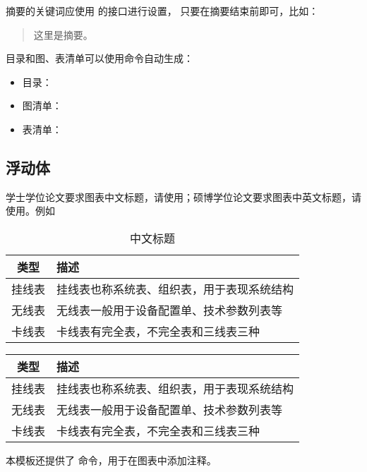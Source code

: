\documentclass[a4paper]{ltxdoc}
\begin{document}
摘要的关键词应使用  的接口进行设置，
只要在摘要结束前即可，比如：
\begin{latex}
  \begin{abstract}
    这里是摘要。
  \end{abstract}
\end{latex}

目录和图、表清单可以使用命令自动生成：
\begin{itemize}
  \item 目录：  
  \item 图清单：
  \item 表清单：
\end{itemize}


\subsection{浮动体}

学士学位论文要求图表中文标题，请使用；硕博学位论文要求图表中英文标题，请使用。例如

\begin{table}[h]
  \centering
   \caption{中文标题} %
  \label{tab:exampletable-zh}
  \begin{tabular}{cl}
    \toprule
    类型   & 描述                                       \\
    \midrule
    挂线表 & 挂线表也称系统表、组织表，用于表现系统结构 \\
    无线表 & 无线表一般用于设备配置单、技术参数列表等   \\
    卡线表 & 卡线表有完全表，不完全表和三线表三种       \\
    \bottomrule
  \end{tabular}
\end{table}
\begin{table}[h]
  \centering
   \label{tab:exampletable-zh-en}
  \begin{tabular}{cl}
    \toprule
    类型   & 描述                                       \\
    \midrule
    挂线表 & 挂线表也称系统表、组织表，用于表现系统结构 \\
    无线表 & 无线表一般用于设备配置单、技术参数列表等   \\
    卡线表 & 卡线表有完全表，不完全表和三线表三种       \\
    \bottomrule
  \end{tabular}
\end{table}
\DescribeMacro{\note}
本模板还提供了  命令，用于在图表中添加注释。
\end{document}
